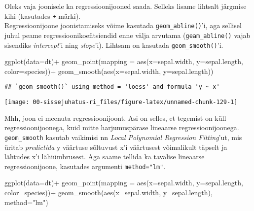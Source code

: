 \documentclass[
]{book}
\newenvironment{Shaded}{\begin{snugshade}}{\end{snugshade}}
\newcommand{\AttributeTok}[1]{\textcolor[rgb]{0.77,0.63,0.00}{#1}}
\newcommand{\FunctionTok}[1]{\textcolor[rgb]{0.00,0.00,0.00}{#1}}
\newcommand{\NormalTok}[1]{#1}
\newcommand{\SpecialCharTok}[1]{\textcolor[rgb]{0.00,0.00,0.00}{#1}}
\newcommand{\StringTok}[1]{\textcolor[rgb]{0.31,0.60,0.02}{#1}}
\begin{document}
Oleks vaja joonisele ka regressioonijooned saada. Selleks lisame lihtsalt järgmise kihi (kasutades \texttt{+} märki).\\
Regressioonijoone joonistamiseks võime kasutada \texttt{geom\_abline()}'i, aga sellisel juhul peame regressioonikoefitsiendid enne välja arvutama (\texttt{geam\_abline()} vajab sisendiks \emph{intercept}'i ning \emph{slope}'i). Lihtsam on kasutada \texttt{geom\_smooth()}'i.

\begin{Shaded}
\begin{Highlighting}[]
\FunctionTok{ggplot}\NormalTok{(}\AttributeTok{data=}\NormalTok{dt)}\SpecialCharTok{+}
  \FunctionTok{geom\_point}\NormalTok{(}\AttributeTok{mapping =} \FunctionTok{aes}\NormalTok{(}\AttributeTok{x=}\NormalTok{sepal.width, }\AttributeTok{y=}\NormalTok{sepal.length, }\AttributeTok{color=}\NormalTok{species))}\SpecialCharTok{+}
  \FunctionTok{geom\_smooth}\NormalTok{(}\FunctionTok{aes}\NormalTok{(}\AttributeTok{x=}\NormalTok{sepal.width, }\AttributeTok{y=}\NormalTok{sepal.length))}
\end{Highlighting}
\end{Shaded}

\begin{verbatim}
## `geom_smooth()` using method = 'loess' and formula 'y ~ x'
\end{verbatim}

\begin{center}\texttt{[image: 00-sissejuhatus-ri\_files/figure-latex/unnamed-chunk-129-1]} \end{center}

Mhh, joon ei meenuta regressioonijoont. Asi on selles, et tegemist on küll regressioonijoonega, kuid mitte harjumuspärase lineaarse regressioonijoonega. \texttt{geom\_smooth} kasutab vaikimisi nn \emph{Local Polynomial Regression Fitting}'ut, mis üritab \emph{predictida} y väärtuse sõltuvust x'i väärtusest võimalikult täpselt ja lähtudes x'i lähiümbrusest. Aga saame tellida ka tavalise lineaarse regressioonijoone, kasutades argumenti \texttt{method="lm"}.

\begin{Shaded}
\begin{Highlighting}[]
\FunctionTok{ggplot}\NormalTok{(}\AttributeTok{data=}\NormalTok{dt)}\SpecialCharTok{+}
  \FunctionTok{geom\_point}\NormalTok{(}\AttributeTok{mapping =} \FunctionTok{aes}\NormalTok{(}\AttributeTok{x=}\NormalTok{sepal.width, }\AttributeTok{y=}\NormalTok{sepal.length, }\AttributeTok{color=}\NormalTok{species))}\SpecialCharTok{+}
  \FunctionTok{geom\_smooth}\NormalTok{(}\FunctionTok{aes}\NormalTok{(}\AttributeTok{x=}\NormalTok{sepal.width, }\AttributeTok{y=}\NormalTok{sepal.length), }\AttributeTok{method=}\StringTok{"lm"}\NormalTok{)}
\end{Highlighting}
\end{Shaded}
\end{document}
